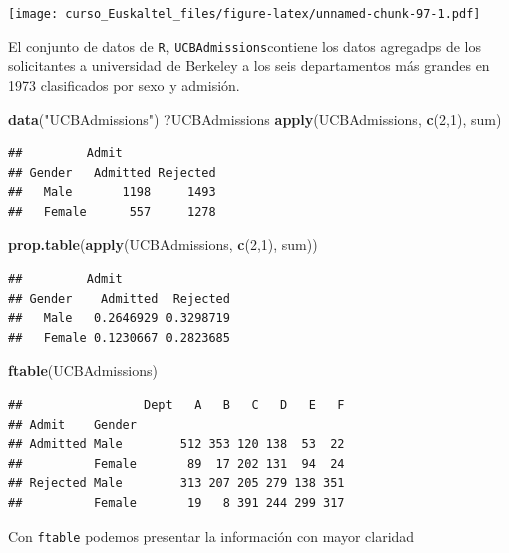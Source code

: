 \documentclass[]{book}
\newenvironment{Shaded}{\begin{snugshade}}{\end{snugshade}}
\newcommand{\KeywordTok}[1]{\textcolor[rgb]{0.13,0.29,0.53}{\textbf{#1}}}
\newcommand{\DecValTok}[1]{\textcolor[rgb]{0.00,0.00,0.81}{#1}}
\newcommand{\StringTok}[1]{\textcolor[rgb]{0.31,0.60,0.02}{#1}}
\newcommand{\NormalTok}[1]{#1}
\begin{document}
\texttt{[image: curso\_Euskaltel\_files/figure-latex/unnamed-chunk-97-1.pdf]}

El conjunto de datos de \texttt{R}, \texttt{UCBAdmissions}contiene los
datos agregadps de los solicitantes a universidad de Berkeley a los seis
departamentos más grandes en 1973 clasificados por sexo y admisión.

\begin{Shaded}
\begin{Highlighting}[]
\KeywordTok{data}\NormalTok{(}\StringTok{"UCBAdmissions"}\NormalTok{)}
\NormalTok{?UCBAdmissions}
\KeywordTok{apply}\NormalTok{(UCBAdmissions, }\KeywordTok{c}\NormalTok{(}\DecValTok{2}\NormalTok{,}\DecValTok{1}\NormalTok{), sum)}
\end{Highlighting}
\end{Shaded}

\begin{verbatim}
##         Admit
## Gender   Admitted Rejected
##   Male       1198     1493
##   Female      557     1278
\end{verbatim}

\begin{Shaded}
\begin{Highlighting}[]
\KeywordTok{prop.table}\NormalTok{(}\KeywordTok{apply}\NormalTok{(UCBAdmissions, }\KeywordTok{c}\NormalTok{(}\DecValTok{2}\NormalTok{,}\DecValTok{1}\NormalTok{), sum))}
\end{Highlighting}
\end{Shaded}

\begin{verbatim}
##         Admit
## Gender    Admitted  Rejected
##   Male   0.2646929 0.3298719
##   Female 0.1230667 0.2823685
\end{verbatim}

\begin{Shaded}
\begin{Highlighting}[]
\KeywordTok{ftable}\NormalTok{(UCBAdmissions)}
\end{Highlighting}
\end{Shaded}

\begin{verbatim}
##                 Dept   A   B   C   D   E   F
## Admit    Gender                             
## Admitted Male        512 353 120 138  53  22
##          Female       89  17 202 131  94  24
## Rejected Male        313 207 205 279 138 351
##          Female       19   8 391 244 299 317
\end{verbatim}

Con \texttt{ftable} podemos presentar la información con mayor claridad
\end{document}
